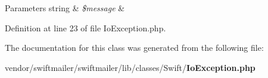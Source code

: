 \begin{DoxyParams}[1]{Parameters}
string & {\em \$message} & \\
\hline
\end{DoxyParams}


Definition at line 23 of file Io\+Exception.\+php.



The documentation for this class was generated from the following file\+:\begin{DoxyCompactItemize}
\item 
vendor/swiftmailer/swiftmailer/lib/classes/\+Swift/{\bf Io\+Exception.\+php}\end{DoxyCompactItemize}
